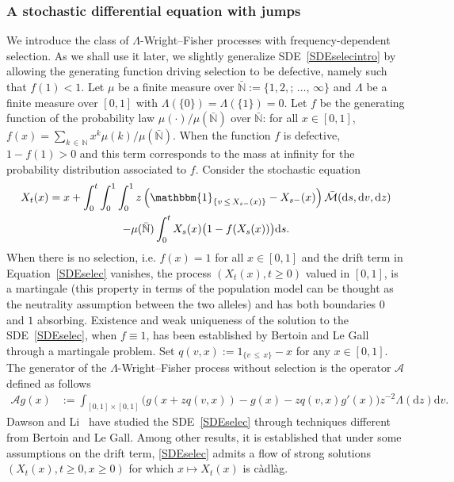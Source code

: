 \documentclass[AHL,Unicode,longabstracts,published]{cedram}
\newcommand{\ddr}{\mathrm{d}}
\newcommand{\bbmun}{\mathbbm{1}}
\newcommand{\bbN}{\mathbb{N}}
\newcommand{\clM}{\mathcal{M}}
\newcommand{\clA}{\mathcal{A}}
\begin{document}
\subsubsection{A stochastic differential equation with jumps} 

We introduce the class of $\Lambda$-Wright--Fisher processes with frequency-dependent selection. As we shall use it later, we slightly generalize SDE~\eqref{SDEselecintro} by allowing the generating function driving selection to be defective, namely such that $f(1)<1$. Let $\mu$ be a finite measure over $\bar{\bbN}:=\{1,2,;\,\ldots,\,\infty\}$ and $\Lambda$ be a finite measure over $[0,1]$ with $\Lambda(\{0\})=\Lambda(\{1\})=0$. Let $f$ be the generating function of the probability law $\mu(\cdot)/\mu(\bar{\bbN})$ over $\bar{\bbN}$: for all $x\in [0,1]$, $f(x)=\sum_{k\,\in\,\bbN}x^{k}\mu(k)/\mu(\bar{\bbN})$. When the function $f$ is defective, $1-f(1)>0$ and this term corresponds to the mass at infinity for the probability distribution associated to $f$. Consider the stochastic equation
\begin{multline}\label{SDEselec}
X_t(x)=x+\int_{0}^{t}\int_{0}^{1}\int_{0}^{1}z\left(\bbmun_{\left\{v\,\leq\,X_{s-}(x)\right\}}-X_{s-}(x)\right)\bar{\clM}(\ddr s,\ddr v, \ddr z)\\
-\mu(\bar{\bbN})\int_{0}^{t}X_{s}(x)\big(1-f(X_{s}(x))\big)\ddr s.
\end{multline}
When there is no selection, i.e. $f(x)=1$ for all $x\in [0,1]$ and the drift term in Equation~\eqref{SDEselec} vanishes, the process $(X_t(x),t\geq 0)$ valued in $[0,1]$, is a martingale (this property in terms of the population model can be thought as the neutrality assumption between the two alleles) and has both boundaries $0$ and $1$ absorbing. Existence and weak uniqueness of the solution to the SDE~\eqref{SDEselec}, when $f\equiv 1$, has been established by Bertoin and Le Gall~\cite{LGB2} through a martingale problem. Set $q(v,x):=1_{\{v\,\leq\,x\}}-x$ for any $x\in [0,1]$. The generator of the $\Lambda$-Wright--Fisher process without selection is the operator $\clA$ defined as follows
\begin{align}\label{generator}
\clA g(x)&:=\int_{[0,1]\times [0,1]}\big(g(x+zq(v,x))-g(x)-zq(v,x)g'(x)\big) z^{-2}\Lambda(\ddr z)\ddr v.
\end{align}
Dawson and Li~\cite{DawsonLi} have studied the SDE~\eqref{SDEselec} through techniques different from Bertoin and Le Gall. Among other results, it is established that under some assumptions on the drift term, \eqref{SDEselec} admits a flow of strong solutions $(X_t(x),t\geq 0,x\geq 0)$ for which $x\mapsto X_t(x)$ is càdlàg.
\end{document}

